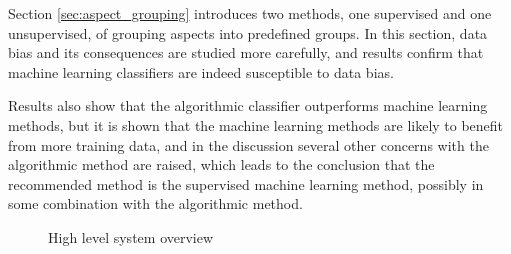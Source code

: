 \documentclass[a4paper,11pt]{kth-mag}
\begin{document}
Section \ref{sec:aspect_grouping} introduces two methods, one supervised and one unsupervised, of grouping aspects into
predefined groups. In this section, data bias and its consequences are studied more carefully, and results confirm that
machine learning classifiers are indeed susceptible to data bias.

Results also show that the algorithmic classifier outperforms machine learning methods, but it is shown that the machine
learning methods are likely to benefit from more training data, and in the discussion several other concerns with the
algorithmic method are raised, which leads to the conclusion that the recommended method is the supervised machine
learning method, possibly in some combination with the algorithmic method.



\begin{figure}[t]
  \centering
  \caption{High level system overview}
  \label{fig:overview}
\end{figure}
\end{document}
